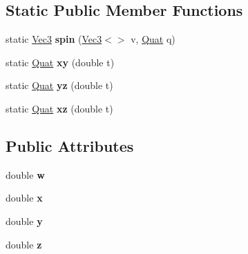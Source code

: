 \subsection*{Static Public Member Functions}
\begin{DoxyCompactItemize}
\item 
\hypertarget{classvsr_1_1_quat_a1b2b3fe11f6a952b02a35d218887257d}{static \hyperlink{classvsr_1_1_vec3}{Vec3} {\bfseries spin} (\hyperlink{classvsr_1_1_vec3}{Vec3}$<$$>$ v, \hyperlink{classvsr_1_1_quat}{Quat} q)}\label{classvsr_1_1_quat_a1b2b3fe11f6a952b02a35d218887257d}

\item 
\hypertarget{classvsr_1_1_quat_a3f73703b84adf2aecc9b4e6032b1c433}{static \hyperlink{classvsr_1_1_quat}{Quat} {\bfseries xy} (double t)}\label{classvsr_1_1_quat_a3f73703b84adf2aecc9b4e6032b1c433}

\item 
\hypertarget{classvsr_1_1_quat_a4c427fccdea5db515a0c6521ca947385}{static \hyperlink{classvsr_1_1_quat}{Quat} {\bfseries yz} (double t)}\label{classvsr_1_1_quat_a4c427fccdea5db515a0c6521ca947385}

\item 
\hypertarget{classvsr_1_1_quat_a3a6c350f6b253e6aded59317a2978fe1}{static \hyperlink{classvsr_1_1_quat}{Quat} {\bfseries xz} (double t)}\label{classvsr_1_1_quat_a3a6c350f6b253e6aded59317a2978fe1}

\end{DoxyCompactItemize}
\subsection*{Public Attributes}
\begin{DoxyCompactItemize}
\item 
\hypertarget{classvsr_1_1_quat_a3b94070a4102f259dccf1588abd7f170}{double {\bfseries w}}\label{classvsr_1_1_quat_a3b94070a4102f259dccf1588abd7f170}

\item 
\hypertarget{classvsr_1_1_quat_a9dc25f63efd4e91ce3c6810ab8793d82}{double {\bfseries x}}\label{classvsr_1_1_quat_a9dc25f63efd4e91ce3c6810ab8793d82}

\item 
\hypertarget{classvsr_1_1_quat_a1e4ee761becd66f3b2d06ba929b1cc12}{double {\bfseries y}}\label{classvsr_1_1_quat_a1e4ee761becd66f3b2d06ba929b1cc12}

\item 
\hypertarget{classvsr_1_1_quat_a2d47f66fce67a6e9bcd5da78ffe47ecb}{double {\bfseries z}}\label{classvsr_1_1_quat_a2d47f66fce67a6e9bcd5da78ffe47ecb}

\end{DoxyCompactItemize}
